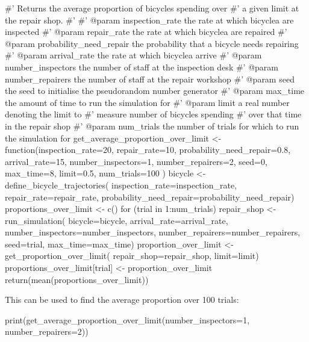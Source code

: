 \begin{Rin}
#' Returns the average proportion of bicycles spending over
#' a given limit at the repair shop.
#'
#' @param inspection_rate the rate at which bicyclea are inspected
#' @param repair_rate the rate at which bicyclea are repaired
#' @param probability_need_repair the probability that a bicycle needs repairing
#' @param arrival_rate the rate at which bicyclea arrive
#' @param number_inspectors the number of staff at the inspection desk
#' @param number_repairers the number of staff at the repair workshop
#' @param seed the seed to initialise the pseudorandom number generator
#' @param max_time the amount of time to run the simulation for
#' @param limit a real number denoting the limit to
#'              measure number of bicycles spending
#'              over that time in the repair shop
#' @param num_trials the number of trials for which to run the simulation for
get_average_proportion_over_limit <- function(inspection_rate=20,
                                              repair_rate=10,
                                              probability_need_repair=0.8,
                                              arrival_rate=15,
                                              number_inspectors=1,
                                              number_repairers=2,
                                              seed=0,
                                              max_time=8,
                                              limit=0.5,
                                              num_trials=100
) {
  bicycle <- define_bicycle_trajectories(
    inspection_rate=inspection_rate,
    repair_rate=repair_rate,
    probability_need_repair=probability_need_repair)
  proportions_over_limit <- c()
  for (trial in 1:num_trials) {
    repair_shop <- run_simulation(
      bicycle=bicycle,
      arrival_rate=arrival_rate,
      number_inspectors=number_inspectors,
      number_repairers=number_repairers,
      seed=trial,
      max_time=max_time)
    proportion_over_limit <- get_proportion_over_limit(
      repair_shop=repair_shop,
      limit=limit)
    proportions_over_limit[trial] <- proportion_over_limit
  }
  return(mean(proportions_over_limit))
}
\end{Rin}

This can be used to find the average proportion over 100 trials:

\begin{Rin}
print(get_average_proportion_over_limit(number_inspectors=1, number_repairers=2))
\end{Rin}

